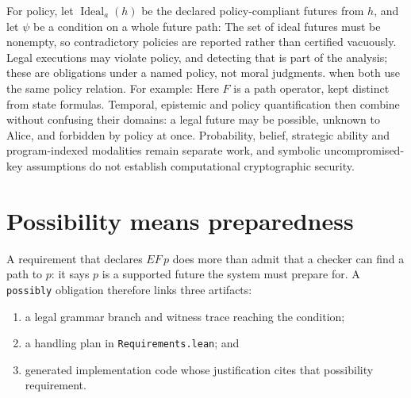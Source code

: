 For policy, let $\operatorname{Ideal}_a(h)$ be the declared policy-compliant
futures from $h$, and let $\psi$ be a condition on a whole future path:
The set of ideal futures must be nonempty, so contradictory policies are reported
rather than certified vacuously. Legal executions may violate policy, and detecting
that is part of the analysis; these are obligations under a named policy, not moral
judgments.
when both use the same policy relation. For example:
Here $F$ is a path operator, kept distinct from state formulas. Temporal, epistemic
and policy quantification then combine without confusing their domains: a legal
future may be possible, unknown to Alice, and forbidden by policy at once.
Probability, belief, strategic ability and program-indexed modalities remain
separate work, and symbolic uncompromised-key assumptions do not establish
computational cryptographic security.

\section{Possibility means preparedness}

A requirement that declares $EF\,p$ does more than admit that a checker can find a
path to $p$: it says $p$ is a supported future the system must prepare for. A
\texttt{possibly} obligation therefore links three artifacts:

\begin{enumerate}
  \item a legal grammar branch and witness trace reaching the condition;
  \item a handling plan in \texttt{Requirements.lean}; and
  \item generated implementation code whose justification cites that
        possibility requirement.
\end{enumerate}

